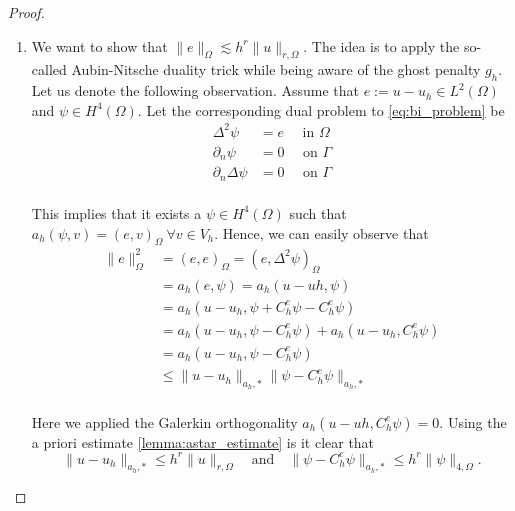 \begin{proof}
\begin{enumerate}[label=\arabic*)]
    \item We want to show that $ \| e \|_{ \Omega  }^{  } \lesssim   h^{r} \| u \|_{ r,\Omega  }^{  }$. The idea is to apply the so-called Aubin-Nitsche duality trick while being aware of the ghost penalty $g_{h}$. Let us denote the following
        observation.
        Assume that $e:= u -u_{h} \in L^{2}( \Omega ) $ and $\psi  \in H^{4}( \Omega ) $.
        Let the corresponding dual problem to \eqref{eq:bi_problem} be
        \begin{equation}
            \begin{split}
            \Delta ^2 \psi &= e  \quad  \text{ in } \Omega  \\
            \partial _{n} \psi &= 0 \quad \text{ on } \Gamma \\
            \partial _{n} \Delta \psi & = 0 \quad  \text{ on } \Gamma   \\
            \end{split}
        \end{equation}

        This implies that it exists a $\psi \in H^{4}( \Omega ) $ such that $a_{h}( \psi, v ) = ( e,v)_{\Omega } \ \forall v \in V_{h}  $. Hence, we can easily observe that \begin{equation}
            \label{eq:ni_1}
            \begin{split}
        \| e \|_{ \Omega  }^{ 2 }  & = ( e,e)_\Omega   = ( e, \Delta ^2 \psi )_{\Omega } \\
        &= a_{h}( e, \psi ) = a_{h}( u-uh, \psi ) \\
        &= a_{h}( u-u_h, \psi + C^{e}_{h}\psi  - C^{e}_{h}\psi )  \\
        &= a_{h}( u-u_h, \psi   - C^{e}_{h}\psi ) +  a_{h}( u-u_h, C^{e}_{h}\psi )  \\
        &= a_{h}( u-u_h, \psi  - C^{e}_{h}\psi )  \\
        &\le   \|u-u_{h}  \|_{a_{h},*  }^{  }  \| \psi  - C^{e}_{h}\psi \|_{a_{h},*  }^{  }    \\
            \end{split}
        \end{equation}

        Here we applied the Galerkin orthogonality $ a_{h}( u-uh, C^{e}_{h}\psi ) = 0$.
        Using the a priori estimate \eqref{lemma:astar_estimate}  is it clear that
        \begin{equation}
            \label{eq:ni_2}
        \|u-u_{h}  \|_{a_{h},*  }^{  }  \le h^{r} \| u \|_{r,\Omega  }^{  }\quad  \text{and}\quad  \| \psi  - C^{e}_{h}\psi \|_{a_{h},*  }^{  }  \le h^{r} \| \psi  \|_{4, \Omega   }^{  }.
        \end{equation}


\end{enumerate}
\end{proof}
